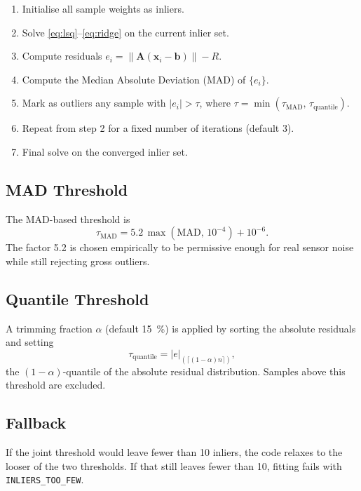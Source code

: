 \documentclass[conference]{IEEEtran}
\begin{document}
    \begin{enumerate}
        \item Initialise all sample weights as inliers.
        \item Solve \eqref{eq:lsq}--\eqref{eq:ridge} on the current inlier set.
        \item Compute residuals $e_i = \|\mathbf{A}(\mathbf{x}_i - \mathbf{b})\| - R$.
        \item Compute the Median Absolute Deviation (MAD) of $\{e_i\}$.
        \item Mark as outliers any sample with $|e_i| > \tau$, where
        $\tau = \min(\tau_\text{MAD},\,\tau_\text{quantile})$.
        \item Repeat from step 2 for a fixed number of iterations
        (default 3).
        \item Final solve on the converged inlier set.
    \end{enumerate}

    \subsection{MAD Threshold}

    The MAD-based threshold is
    \begin{equation}
        \tau_\text{MAD} = 5.2\,\max(\mathrm{MAD},\,10^{-4}) + 10^{-6}.
    \end{equation}
    The factor 5.2 is chosen empirically to be permissive enough for
    real sensor noise while still rejecting gross outliers.

    \subsection{Quantile Threshold}

    A trimming fraction $\alpha$ (default \SI{15}{\percent}) is applied by
    sorting the absolute residuals and setting
    \begin{equation}
        \tau_\text{quantile} = |e|_{(\lceil(1-\alpha)n\rceil)},
    \end{equation}
    the $(1-\alpha)$-quantile of the absolute residual distribution.
    Samples above this threshold are excluded.

    \subsection{Fallback}

    If the joint threshold would leave fewer than 10 inliers, the code
    relaxes to the looser of the two thresholds.
    If that still leaves fewer than 10, fitting fails with
    \texttt{INLIERS\_TOO\_FEW}.
\end{document}
